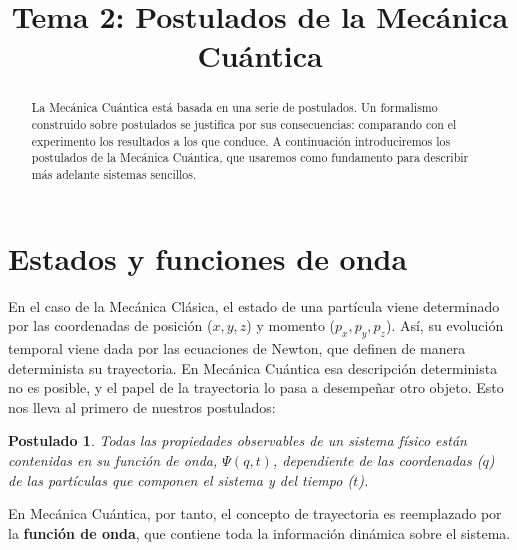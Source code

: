 \documentclass{tufte-handout}
\title[Química Física II: Tema 2, Postulados]{
Tema 2: Postulados de la Mecánica Cuántica}
\date{}  %
\newtheorem{theorem}{Postulado}
\begin{document}
\maketitle%

\begin{abstract}
\noindent La Mecánica Cuántica está basada en una serie de
postulados. Un formalismo construido sobre
postulados se justifica por sus consecuencias: comparando con
el experimento los resultados a los que conduce.
A continuación introduciremos
los postulados de la Mecánica Cuántica, que usaremos 
como fundamento para describir más adelante sistemas
sencillos.
\end{abstract}




\section{Estados y funciones de onda}
En el caso de la Mecánica Clásica, el estado de una partícula
viene determinado por las  coordenadas de posición ($x, y, z$) 
y momento ($p_x, p_y, p_z$). Así, su evolución temporal viene
dada por las ecuaciones de Newton, que definen de manera 
determinista su trayectoria. En Mecánica Cuántica esa
descripción determinista no es posible, y el papel de la
trayectoria lo pasa a desempeñar otro objeto. Esto nos lleva
al primero de nuestros postulados:

\begin{theorem}
Todas las propiedades observables de un sistema físico 
están contenidas en su función de onda, $\Psi(q,t)$,
dependiente de las coordenadas ($q$) de las
partículas que componen el sistema y del tiempo ($t$). 
\end{theorem}

En Mecánica Cuántica, por tanto, el concepto de 
trayectoria es reemplazado por la \textbf{función de
onda}, que contiene toda la información dinámica 
sobre el sistema.
\end{document}
